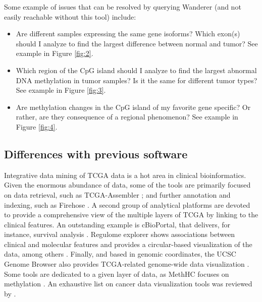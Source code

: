 \documentclass{bmcart}
\begin{document}
Some example of issues that can be resolved by querying Wanderer (and not easily reachable without this tool) include:
\begin{itemize}
\item Are different samples expressing the same gene isoforms? Which exon(s) should I analyze to find the largest difference between normal and tumor? See example in Figure \ref{fig:2}.
\item Which region of the CpG island should I analyze to find the largest abnormal DNA methylation in tumor samples? Is it the same for different tumor types? See example in Figure \ref{fig:3}.
\item Are methylation changes in the CpG island of my favorite gene specific? Or rather, are they consequence of a regional phenomenon? See example in Figure \ref{fig:4}.
\end{itemize}




\subsection*{Differences with previous software}

Integrative data mining of TCGA data is a hot area in clinical bioinformatics. Given the enormous abundance of data, some of the tools are primarily focused on data retrieval, such as TCGA-Assembler \cite{zhu2014tcga}; and further annotation and indexing, such as Firehose \cite{robbins2013self}. A second group of analytical platforms are devoted to provide a comprehensive view of the multiple layers of TCGA by linking to the clinical features. An outstanding example is cBioPortal, that delivers, for instance, survival analysis \cite{gao2013integrative}. Regulome explorer shows associations between clinical and molecular features and provides a circular-based visualization of the data, among others \cite{cancer2012comprehensive}. Finally, and based in genomic coordinates, the UCSC Genome Browser also provides TCGA-related genome-wide data visualization \cite{sanborn2010ucsc}. Some tools are dedicated to a given layer of data, as MethHC focuses on methylation \cite{huang2014methhc}. An exhaustive list on cancer data visualization tools was reviewed by \cite{schroeder2013visualizing}.\\
\end{document}
